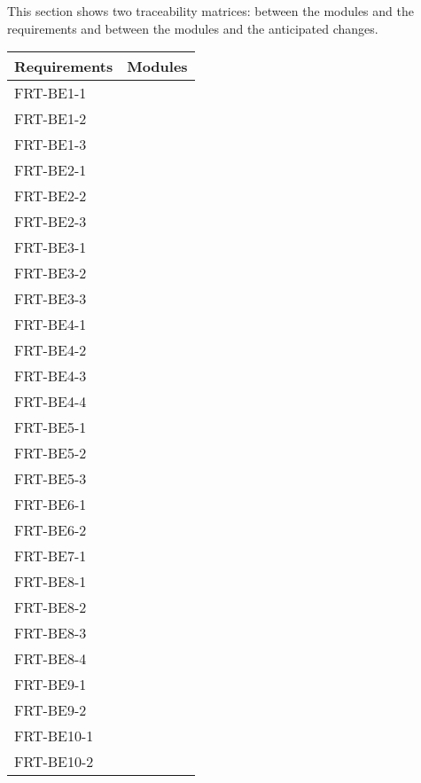 \documentclass[12pt, titlepage]{article}
\begin{document}
This section shows two traceability matrices: between the modules and the requirements and between
the modules and the anticipated changes.

\begin{longtable}{p{} p{}}
	\toprule
	\textbf{Requirements} & \textbf{Modules} \\
	\midrule
	FRT-BE1-1             & ~                \\
	FRT-BE1-2             & ~                \\
	FRT-BE1-3             & ~                \\
	FRT-BE2-1             & ~                \\
	FRT-BE2-2             & ~                \\
	FRT-BE2-3             & ~                \\
	FRT-BE3-1             & ~                \\
	FRT-BE3-2             & ~                \\
	FRT-BE3-3             & ~                \\
	FRT-BE4-1             & ~                \\
	FRT-BE4-2             & ~                \\
	FRT-BE4-3             & ~                \\
	FRT-BE4-4             & ~                \\
	FRT-BE5-1             & ~                \\
	FRT-BE5-2             & ~                \\
	FRT-BE5-3             & ~                \\
	FRT-BE6-1             & ~                \\
	FRT-BE6-2             & ~                \\
	FRT-BE7-1             & ~                \\
	FRT-BE8-1             & ~                \\
	FRT-BE8-2             & ~                \\
	FRT-BE8-3             & ~                \\
	FRT-BE8-4             & ~                \\
	FRT-BE9-1             & ~                \\
	FRT-BE9-2             & ~                \\
	FRT-BE10-1            & ~                \\
	FRT-BE10-2            & ~                \\

\end{longtable}
\end{document}
